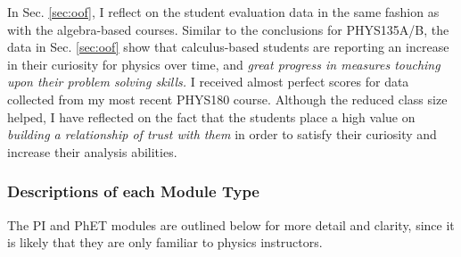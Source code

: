 \documentclass[../../../main.tex]{subfiles}
\begin{document}
In Sec. \ref{sec:oof}, I reflect on the student evaluation data in the same fashion as with the algebra-based courses.  Similar to the conclusions for PHYS135A/B, the data in Sec. \ref{sec:oof} show that calculus-based students are reporting an increase in their curiosity for physics over time, and \textit{great progress in measures touching upon their problem solving skills.}  I received almost perfect scores for data collected from my most recent PHYS180 course.  Although the reduced class size helped, I have reflected on the fact that the students place a high value on \textit{building a relationship of trust with them} in order to satisfy their curiosity and increase their analysis abilities.

\subsubsection{Descriptions of each Module Type}
\label{sec:moduleType}

The PI and PhET modules are outlined below for more detail and clarity, since it is likely that they are only familiar to physics instructors. \\ \hspace{0.1cm}
\end{document}
